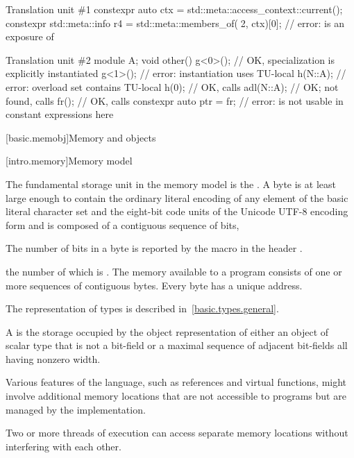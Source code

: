\begin{example}
\begin{codeblocktu}{Translation unit \#1}
constexpr auto ctx = std::meta::access_context::current();
constexpr std::meta::info r4 =
  std::meta::members_of(^^N2, ctx)[0];              // error:  is an exposure of 
\end{codeblocktu}
\begin{codeblocktu}{Translation unit \#2}
module A;
void other() {
  g<0>();                           // OK, specialization is explicitly instantiated
  g<1>();                           // error: instantiation uses TU-local 
  h(N::A{});                        // error: overload set contains TU-local 
  h(0);                             // OK, calls 
  adl(N::A{});                      // OK;  not found, calls 
  fr();                             // OK, calls 
  constexpr auto ptr = fr;          // error:  is not usable in constant expressions here
}
\end{codeblocktu}
\end{example}

[basic.memobj]{Memory and objects}

[intro.memory]{Memory model}

\pnum
{}%
The fundamental storage unit in the \Cpp{} memory model is the
.
A byte is at least large enough to contain
the ordinary literal encoding of any element of the basic
%
literal character set
and the eight-bit code units of the Unicode
%
UTF-8 encoding form
and is composed of a contiguous sequence of
bits,
\begin{footnote}
The number of bits in a byte is reported by the macro
 in the header .
\end{footnote}
the number of which is .
The memory available to a \Cpp{} program consists of one or more sequences of
contiguous bytes.
Every byte has a unique address.

\pnum
\begin{note}
The representation of types is described
in~\ref{basic.types.general}.
\end{note}

\pnum
A  is
the storage occupied by the object representation of
either an object of scalar type that is not a bit-field
or a maximal sequence of adjacent bit-fields all having nonzero width.
\begin{note}
Various
features of the language, such as references and virtual functions, might
involve additional memory locations that are not accessible to programs but are
managed by the implementation.
\end{note}
Two or more threads of
execution can access separate memory
locations without interfering with each other.

